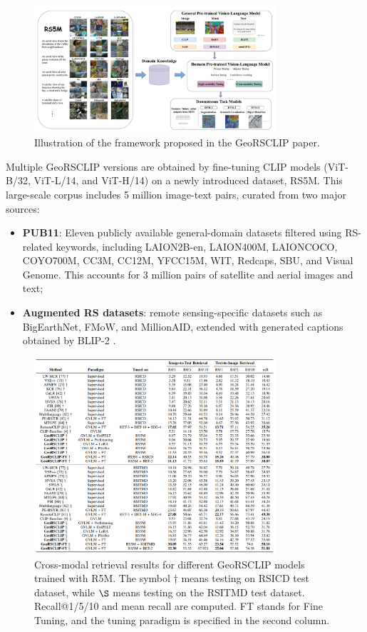 \documentclass[a4paper, twoside, english]{sapthesis} %
\begin{document}
\begin{figure}[h]
    \centering
    \includegraphics[width=0.8\textwidth]{img/georsclip-framework.png}
    \caption{\normalsize Illustration of the framework proposed in the GeoRSCLIP paper.}
    \label{fig:georsclip-framework}
\end{figure}

Multiple GeoRSCLIP versions are obtained by fine-tuning CLIP models (ViT-B/32, ViT-L/14, and ViT-H/14) on a newly introduced dataset, RS5M. This large-scale corpus includes 5 million image-text pairs, curated from two major sources:

\begin{itemize}
    \item \textbf{PUB11}: Eleven publicly available general-domain datasets filtered using RS-related keywords, including LAION2B-en, LAION400M, LAIONCOCO, COYO700M, CC3M, CC12M, YFCC15M, WIT, Redcaps, SBU, and Visual Genome. This accounts for 3 million pairs of satellite and aerial images and text;
    \item \textbf{Augmented RS datasets}: remote sensing-specific datasets such as BigEarthNet, FMoW, and MillionAID, extended with generated captions obtained by BLIP-2 \cite{li2023blip}.
\end{itemize}

\begin{figure}[h]
    \centering
    \includegraphics[width=0.8\textwidth]{img/georsclip-retrieval-performance.png}
    \caption{\normalsize Cross-modal retrieval results for different GeoRSCLIP models trained with R5M. The symbol $\dagger$ means testing on RSICD test dataset, while $\S$ means testing on the RSITMD test dataset. Recall@1/5/10 and mean recall are computed. FT stands for Fine Tuning, and the tuning paradigm is specified in the second column.}
    \label{fig:georsclip-performance}
\end{figure}
\end{document}
